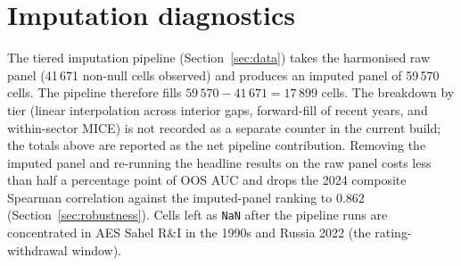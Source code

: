 \section{Imputation diagnostics}\label{app:imputation}

The tiered imputation pipeline (Section~\ref{sec:data}) takes the harmonised raw panel (41\,671 non-null cells observed) and produces an imputed panel of 59\,570 cells. The pipeline therefore fills $59\,570 - 41\,671 = 17\,899$ cells. The breakdown by tier (linear interpolation across interior gaps, forward-fill of recent years, and within-sector MICE) is not recorded as a separate counter in the current build; the totals above are reported as the net pipeline contribution. Removing the imputed panel and re-running the headline results on the raw panel costs less than half a percentage point of OOS AUC and drops the 2024 composite Spearman correlation against the imputed-panel ranking to $0.862$ (Section~\ref{sec:robustness}). Cells left as \texttt{NaN} after the pipeline runs are concentrated in AES Sahel R\&I in the 1990s and Russia 2022 (the rating-withdrawal window).
